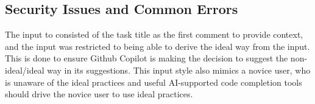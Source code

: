 \subsection{Security Issues and Common Errors}
The input to \cop{} consisted of the task title as the first comment to provide context, and the input was restricted to being able to derive the ideal way from the input. This is done to ensure Github Copilot is making the decision to suggest the non-ideal/ideal way in its suggestions. This input style also mimics a novice user, who is unaware of the ideal practices and useful AI-supported code completion tools
should drive the novice user to use ideal practices.  





